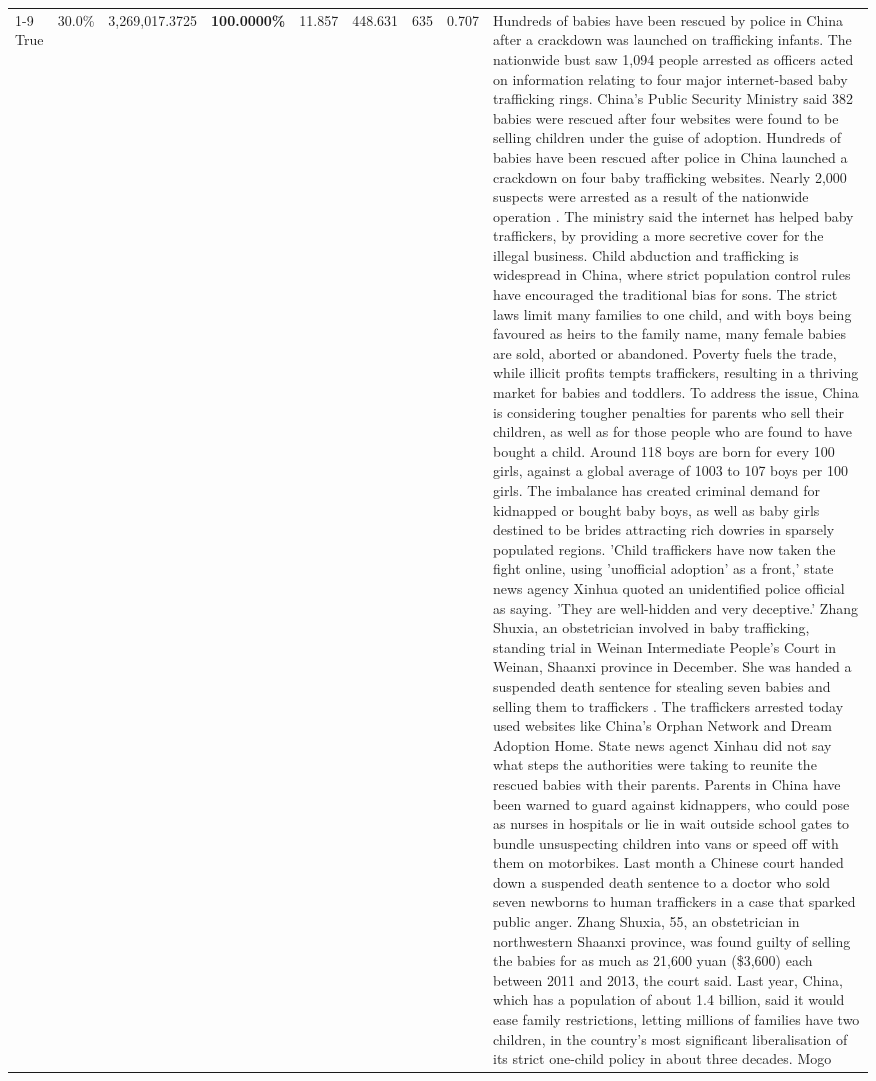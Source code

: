 \begin{table}[H]
\begin{tabular}{lllrlllll}
\cline{1-9}
True & 30.0\% & 3,269,017.3725 & \bfseries \color{red} 100.0000\% & 11.857 & 448.631 & 635 & 0.707 & Hundreds of babies have been rescued by police in China after a crackdown was launched on trafficking infants. The nationwide bust saw 1,094 people arrested as officers acted on information relating to four major internet-based baby trafficking rings. China's Public Security Ministry said 382 babies were rescued after four websites were found to be selling children under the guise of adoption. Hundreds of babies have been rescued after police in China launched a crackdown on four baby trafficking websites. Nearly 2,000 suspects were arrested as a result of the nationwide operation . The ministry said the internet has helped baby traffickers, by providing a more secretive cover for the illegal business. Child abduction and trafficking is widespread in China, where strict population control rules have encouraged the traditional bias for sons. The strict laws limit many families to one child, and with boys being favoured as heirs to the family name, many female babies are sold, aborted or abandoned. Poverty fuels the trade, while illicit profits tempts traffickers, resulting in a thriving market for babies and toddlers. To address the issue, China is considering tougher penalties for parents who sell their children, as well as for those people who are found to have bought a child. Around 118 boys are born for every 100 girls, against a global average of 1003 to 107 boys per 100 girls. The imbalance has created criminal demand for kidnapped or bought baby boys, as well as baby girls destined to be brides attracting rich dowries in sparsely populated regions. 'Child traffickers have now taken the fight online, using 'unofficial adoption' as a front,' state news agency Xinhua quoted an unidentified police official as saying. 'They are well-hidden and very deceptive.' Zhang Shuxia, an obstetrician involved in baby trafficking, standing trial in Weinan Intermediate People's Court in Weinan, Shaanxi province in December. She was handed a suspended death sentence for stealing seven babies and selling them to traffickers . The traffickers arrested today used websites like China's Orphan Network and Dream Adoption Home. State news agenct Xinhau did not say what steps the authorities were taking to reunite the rescued babies with their parents. Parents in China have been warned to guard against kidnappers, who could pose as nurses in hospitals or lie in wait outside school gates to bundle unsuspecting children into vans or speed off with them on motorbikes. Last month a Chinese court handed down a suspended death sentence to a doctor who sold seven newborns to human traffickers in a case that sparked public anger. Zhang Shuxia, 55, an obstetrician in northwestern Shaanxi province, was found guilty of selling the babies for as much as 21,600 yuan (\$3,600) each between 2011 and 2013, the court said. Last year, China, which has a population of about 1.4 billion, said it would ease family restrictions, letting millions of families have two children, in the country's most significant liberalisation of its strict one-child policy in about three decades. Mogo \\

\end{tabular}
\end{table}
